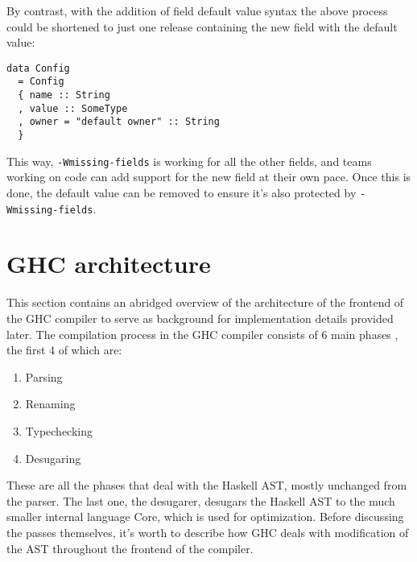 \documentclass[en]{pracamgr}
\begin{document}
By contrast, with the addition of field default value syntax the above process could be shortened 
to just one \infra{} release containing the new field with the default value:\\
\begin{minipage}{\linewidth}
\begin{lstlisting}
data Config 
  = Config
  { name :: String
  , value :: SomeType
  , owner = "default owner" :: String
  }
\end{lstlisting}
\end{minipage}
This way, \texttt{-Wmissing-fields} is working for all the other fields, and teams working on \user{}
code can add support for the new field at their own pace.
Once this is done, the default value can be removed to ensure it's also protected by \texttt{-Wmissing-fields}.
\chapter{GHC architecture}
This section contains an abridged overview of the architecture of the frontend of the GHC compiler to serve as background for implementation details provided later.
The compilation process in the GHC compiler consists of 6 main phases \cite{GHCIntermediateForms}, the first 4 of which are:
\begin{enumerate}
  \item Parsing
  \item Renaming
  \item Typechecking 
  \item Desugaring 
\end{enumerate}
These are all the phases that deal with the Haskell AST, mostly unchanged from the parser. 
The last one, the desugarer, desugars the Haskell AST to the much smaller internal language Core, which is used for optimization.
Before discussing the passes themselves, it's worth to describe how GHC deals with modification of the AST throughout the frontend of the compiler.
\end{document}
